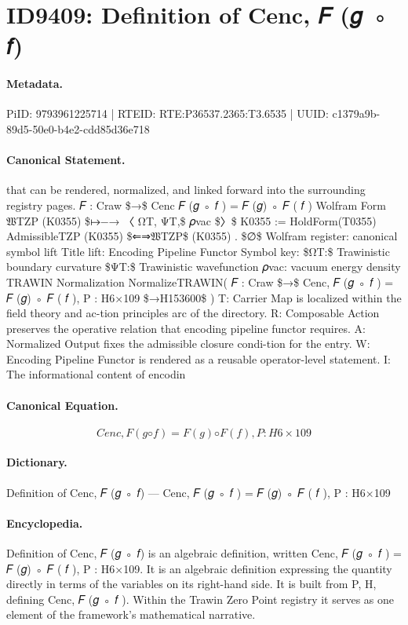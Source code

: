 \section*{ID9409: Definition of Cenc, 𝐹 (𝑔 ◦ 𝑓)}
\paragraph{Metadata.}
PiID: 9793961225714 | RTEID: RTE:P36537.2365:T3.6535 | UUID: c1379a9b-89d5-50e0-b4e2-cdd85d36e718

\paragraph{Canonical Statement.}
that can be rendered, normalized, and linked forward into the surrounding registry pages. 𝐹 : Craw \$→\$ Cenc 𝐹 (𝑔 ◦ 𝑓 ) = 𝐹 (𝑔) ◦ 𝐹 ( 𝑓 ) Wolfram Form 𝔚TZP (K0355) \$↦−→ 〈 ΩT, ΨT,\$ 𝜌vac \$〉\$ K0355 := HoldForm(T0355) AdmissibleTZP (K0355) \$⇐⇒𝔚TZP\$ (K0355) . \$∅\$ Wolfram register: canonical symbol lift Title lift: Encoding Pipeline Functor Symbol key: \$ΩT:\$ Trawinistic boundary curvature \$ΨT:\$ Trawinistic wavefunction 𝜌vac: vacuum energy density TRAWIN Normalization NormalizeTRAWIN( 𝐹 : Craw \$→\$ Cenc, 𝐹 (𝑔 ◦ 𝑓 ) = 𝐹 (𝑔) ◦ 𝐹 ( 𝑓 ), P : H6×109 \$→H153600\$ ) T: Carrier Map is localized within the field theory and ac-tion principles arc of the directory. R: Composable Action preserves the operative relation that encoding pipeline functor requires. A: Normalized Output fixes the admissible closure condi-tion for the entry. W: Encoding Pipeline Functor is rendered as a reusable operator-level statement. I: The informational content of encodin

\paragraph{Canonical Equation.}
\[
Cenc, 𝐹 (𝑔 ◦ 𝑓 ) = 𝐹 (𝑔) ◦ 𝐹 ( 𝑓 ), P : H6×109
\]

\paragraph{Dictionary.}
Definition of Cenc, 𝐹 (𝑔 ◦ 𝑓) — Cenc, 𝐹 (𝑔 ◦ 𝑓 ) = 𝐹 (𝑔) ◦ 𝐹 ( 𝑓 ), P : H6×109

\paragraph{Encyclopedia.}
Definition of Cenc, 𝐹 (𝑔 ◦ 𝑓) is an algebraic definition, written Cenc, 𝐹 (𝑔 ◦ 𝑓 ) = 𝐹 (𝑔) ◦ 𝐹 ( 𝑓 ), P : H6×109. It is an algebraic definition expressing the quantity directly in terms of the variables on its right-hand side. It is built from P, H, defining Cenc, 𝐹 (𝑔 ◦ 𝑓 ). Within the Trawin Zero Point registry it serves as one element of the framework's mathematical narrative.
